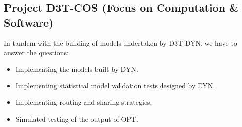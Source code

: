 \subsection*{Project D3T-COS (Focus on Computation & Software)}
In tandem with the building of models undertaken by D3T-DYN, we have to answer the questions:
\begin{itemize}
\item Implementing the models built by DYN. 
\item Implementing statistical model validation tests designed by DYN.
\item Implementing routing \cite{guan_efficient_2013, zhang_probability_2013} and sharing \cite{santi_quantifying_2014} strategies. 
\item Simulated testing of the output of OPT. 
\end{itemize}
